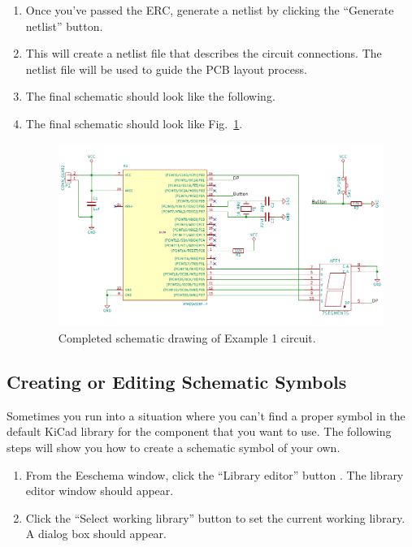 \documentclass[12pt,letterpaper]{scrartcl}
\begin{document}
\begin{enumerate}
	\item Once you’ve passed the ERC, generate a netlist by clicking the ``Generate netlist'' button.
	
	\item This will create a netlist file that describes the circuit connections. The netlist file will be used to guide the PCB layout process.
	
	\item The final schematic should look like the following.
	\item The final schematic should look like Fig.~\ref{fig:example1-schematic-final}.
		\begin{figure}[h]
			\centering
			\includegraphics{example1-schematic-final}
			\caption{Completed schematic drawing of Example 1 circuit.}
			\label{fig:example1-schematic-final}
		\end{figure}		
\end{enumerate}

\subsection{Creating or Editing Schematic Symbols}
Sometimes you run into a situation where you can’t find a proper symbol in the default KiCad library for the component that you want to use. The following steps will show you how to create a schematic symbol of your own. 

\begin{enumerate}
	\item From the Eeschema window, click the “Library editor” button .
	The library editor window should appear.
	\item Click the “Select working library” button  to set the current working library. A dialog box should appear. 
	
	
\end{enumerate}
\end{document}
